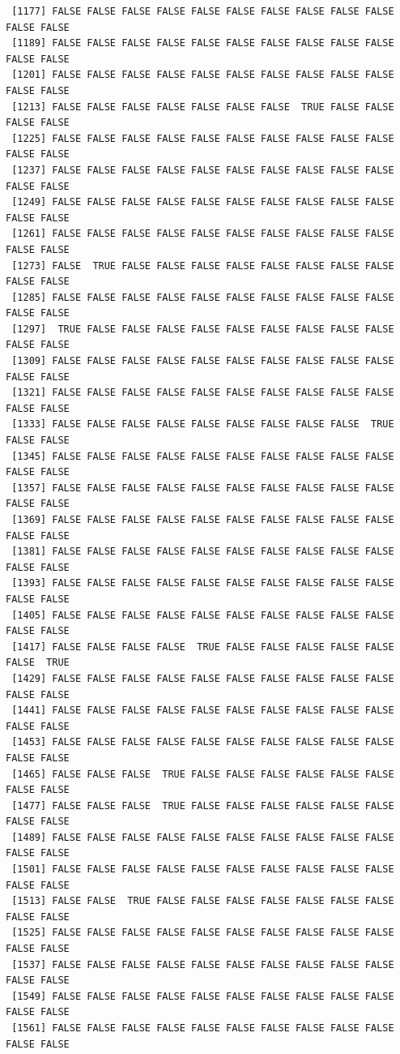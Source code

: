 \documentclass[
  a4paper,
  DIV=11,
  numbers=noendperiod]{scrartcl}
\begin{document}
\begin{verbatim}
 [1177] FALSE FALSE FALSE FALSE FALSE FALSE FALSE FALSE FALSE FALSE FALSE FALSE
 [1189] FALSE FALSE FALSE FALSE FALSE FALSE FALSE FALSE FALSE FALSE FALSE FALSE
 [1201] FALSE FALSE FALSE FALSE FALSE FALSE FALSE FALSE FALSE FALSE FALSE FALSE
 [1213] FALSE FALSE FALSE FALSE FALSE FALSE FALSE  TRUE FALSE FALSE FALSE FALSE
 [1225] FALSE FALSE FALSE FALSE FALSE FALSE FALSE FALSE FALSE FALSE FALSE FALSE
 [1237] FALSE FALSE FALSE FALSE FALSE FALSE FALSE FALSE FALSE FALSE FALSE FALSE
 [1249] FALSE FALSE FALSE FALSE FALSE FALSE FALSE FALSE FALSE FALSE FALSE FALSE
 [1261] FALSE FALSE FALSE FALSE FALSE FALSE FALSE FALSE FALSE FALSE FALSE FALSE
 [1273] FALSE  TRUE FALSE FALSE FALSE FALSE FALSE FALSE FALSE FALSE FALSE FALSE
 [1285] FALSE FALSE FALSE FALSE FALSE FALSE FALSE FALSE FALSE FALSE FALSE FALSE
 [1297]  TRUE FALSE FALSE FALSE FALSE FALSE FALSE FALSE FALSE FALSE FALSE FALSE
 [1309] FALSE FALSE FALSE FALSE FALSE FALSE FALSE FALSE FALSE FALSE FALSE FALSE
 [1321] FALSE FALSE FALSE FALSE FALSE FALSE FALSE FALSE FALSE FALSE FALSE FALSE
 [1333] FALSE FALSE FALSE FALSE FALSE FALSE FALSE FALSE FALSE  TRUE FALSE FALSE
 [1345] FALSE FALSE FALSE FALSE FALSE FALSE FALSE FALSE FALSE FALSE FALSE FALSE
 [1357] FALSE FALSE FALSE FALSE FALSE FALSE FALSE FALSE FALSE FALSE FALSE FALSE
 [1369] FALSE FALSE FALSE FALSE FALSE FALSE FALSE FALSE FALSE FALSE FALSE FALSE
 [1381] FALSE FALSE FALSE FALSE FALSE FALSE FALSE FALSE FALSE FALSE FALSE FALSE
 [1393] FALSE FALSE FALSE FALSE FALSE FALSE FALSE FALSE FALSE FALSE FALSE FALSE
 [1405] FALSE FALSE FALSE FALSE FALSE FALSE FALSE FALSE FALSE FALSE FALSE FALSE
 [1417] FALSE FALSE FALSE FALSE  TRUE FALSE FALSE FALSE FALSE FALSE FALSE  TRUE
 [1429] FALSE FALSE FALSE FALSE FALSE FALSE FALSE FALSE FALSE FALSE FALSE FALSE
 [1441] FALSE FALSE FALSE FALSE FALSE FALSE FALSE FALSE FALSE FALSE FALSE FALSE
 [1453] FALSE FALSE FALSE FALSE FALSE FALSE FALSE FALSE FALSE FALSE FALSE FALSE
 [1465] FALSE FALSE FALSE  TRUE FALSE FALSE FALSE FALSE FALSE FALSE FALSE FALSE
 [1477] FALSE FALSE FALSE  TRUE FALSE FALSE FALSE FALSE FALSE FALSE FALSE FALSE
 [1489] FALSE FALSE FALSE FALSE FALSE FALSE FALSE FALSE FALSE FALSE FALSE FALSE
 [1501] FALSE FALSE FALSE FALSE FALSE FALSE FALSE FALSE FALSE FALSE FALSE FALSE
 [1513] FALSE FALSE  TRUE FALSE FALSE FALSE FALSE FALSE FALSE FALSE FALSE FALSE
 [1525] FALSE FALSE FALSE FALSE FALSE FALSE FALSE FALSE FALSE FALSE FALSE FALSE
 [1537] FALSE FALSE FALSE FALSE FALSE FALSE FALSE FALSE FALSE FALSE FALSE FALSE
 [1549] FALSE FALSE FALSE FALSE FALSE FALSE FALSE FALSE FALSE FALSE FALSE FALSE
 [1561] FALSE FALSE FALSE FALSE FALSE FALSE FALSE FALSE FALSE FALSE FALSE FALSE

\end{verbatim}
\end{document}
